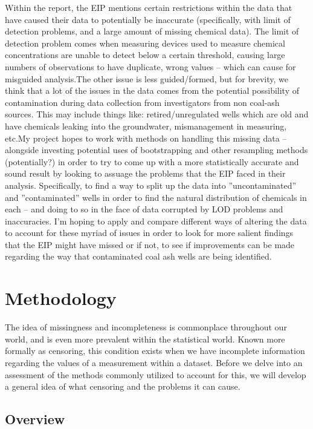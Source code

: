 \documentclass[12pt, twoside]{amherstthesis}
\begin{document}
Within the report, the EIP mentions certain restrictions within the data that have caused their data to potentially be inaccurate (specifically, with limit of detection problems, and a large amount of missing chemical data). The limit of detection problem comes when measuring devices used to measure chemical concentrations are unable to detect below a certain threshold, causing large numbers of observations to have duplicate, wrong values -- which can cause for misguided analysis.The other issue is less guided/formed, but for brevity, we think that a lot of the issues in the data comes from the potential possibility of contamination during data collection from investigators from non coal-ash sources. This may include things like: retired/unregulated wells which are old and have chemicals leaking into the groundwater, mismanagement in measuring, etc.My project hopes to work with methods on handling this missing data -- alongside investing potential uses of bootstrapping and other resampling methods (potentially?) in order to try to come up with a more statistically accurate and sound result by looking to assuage the problems that the EIP faced in their analysis. Specifically, to find a way to split up the data into ''uncontaminated'' and ''contaminated'' wells in order to find the natural distribution of chemicals in each -- and doing to so in the face of data corrupted by LOD problems and inaccuracies. I'm hoping to apply and compare different ways of altering the data to account for these myriad of issues in order to look for more salient findings that the EIP might have missed or if not, to see if improvements can be made regarding the way that contaminated coal ash wells are being identified.

\hypertarget{methodology}{%
\chapter{Methodology}\label{methodology}}

The idea of missingness and incompleteness is commonplace throughout our world, and is even more prevalent within the statistical world. Known more formally as censoring, this condition exists when we have incomplete information regarding the values of a measurement within a dataset. Before we delve into an assessment of the methods commonly utilized to account for this, we will develop a general idea of what censoring and the problems it can cause.

\hypertarget{overview}{%
\section{Overview}\label{overview}}
\end{document}
